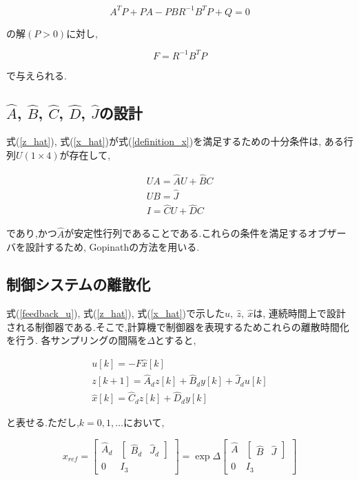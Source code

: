 $$
    A^{T}P + PA - PBR^{-1}B^{T}P + Q = 0
$$

の解$(P > 0)$に対し,

$$
    F = R^{-1}B^{T}P
$$

で与えられる.

\subsection{$\hat{A}$, $\hat{B}$, $\hat{C}$, $\hat{D}$, $\hat{J}$の設計}
式(\ref{z_hat}), 式(\ref{x_hat})が式(\ref{definition_x})を満足するための十分条件は,
ある行列$U(1 \times 4)$が存在して,

$$
    \begin{array}{c}
        UA = \hat{A}U + \hat{B}C \\
        UB = \hat{J} \\
        I = \hat{C}U + \hat{D}C
    \end{array}
$$

であり,かつ$\hat{A}$が安定性行列であることである.これらの条件を満足するオブザーバを設計するため,
Gopinathの方法を用いる.

\subsection{制御システムの離散化}
式(\ref{feedback_u}), 式(\ref{z_hat}), 式(\ref{x_hat})で示した$u,\ \hat{z},\ \hat{x}$は,
連続時間上で設計される制御器である.そこで,計算機で制御器を表現するためこれらの離散時間化を行う.
各サンプリングの間隔を$\Delta$とすると,

$$
    \begin{array}{c}
        u[k] = -F \hat{x}[k] \\
        z[k + 1] = \hat{A}_{d}z[k] + \hat{B}_{d}y[k] + \hat{J}_{d}u[k] \\
        \hat{x}[k] = \hat{C}_{d}z[k] + \hat{D}_{d}y[k]
    \end{array}
$$

と表せる.ただし,$k = 0, 1, \dots$において,

$$
    x_{ref} = 
    \left[
        \begin{array}{cc}
            \hat{A}_{d}  &  \left[
                                \begin{array}{cc}
                                    \hat{B}_{d}  &  \hat{J}_{d}
                                \end{array}
                            \right] \\
            0            &  I_{3}
        \end{array}
    \right]
    =
    \exp \Delta
    \left[
        \begin{array}{cc}
            \hat{A}  &  \left[
                            \begin{array}{cc}
                                \hat{B}  &  \hat{J}
                            \end{array}
                        \right] \\
            0        &  I_{3}
        \end{array}
    \right]
$$

